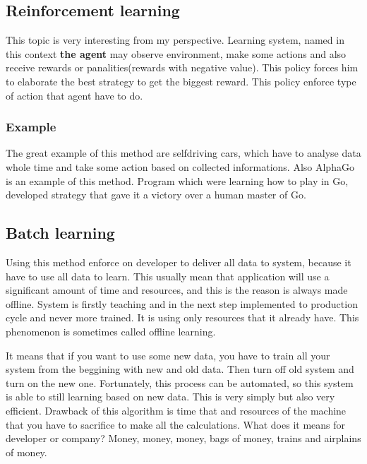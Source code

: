 \documentclass{article}
\begin{document}
   \newpage

  \subsection{Reinforcement learning}
  This topic is very interesting from my perspective. Learning system, named in this context \textbf{the agent} may observe environment, make some actions and also receive rewards or panalities(rewards with negative value). This policy forces him to elaborate the best strategy to get the biggest reward. This policy enforce type of action that agent have to do.

    \subsubsection{Example}
    The great example of this method are selfdriving cars, which have to analyse data whole time and take some action based on collected informations. Also AlphaGo is an example of this method. Program which were learning how to play in Go, developed strategy that gave it a victory over a human master of Go.
  
  \newpage

  \subsection{Batch learning}
  Using this method enforce on developer to deliver all data to system, because it have to use all data to learn. This usually mean that application will use a significant amount of time and resources, and this is the reason is always made offline. System is firstly teaching and in the next step implemented to production cycle and never more trained. It is using only resources that it already have. This phenomenon is sometimes called offline learning. 

  It means that if you want to use some new data, you have to train all your system from the beggining with new and old data. Then turn off old system and turn on the new one. Fortunately, this process can be automated, so this system is able to still learning based on new data. This is very simply but also very efficient. Drawback of this algorithm is time that and resources of the machine that you have to sacrifice to make all the calculations. What does it means for developer or company? Money, money, money, bags of money, trains and airplains of money.

  \newpage
\end{document}
